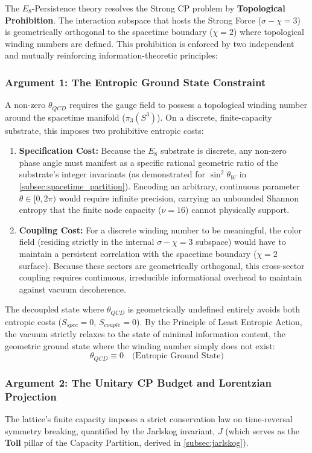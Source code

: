 The $E_8$-Persistence theory resolves the Strong CP problem by \textbf{Topological Prohibition}. The interaction subspace that hosts the Strong Force ($\sigma-\chi=3$) is geometrically orthogonal to the spacetime boundary ($\chi=2$) where topological winding numbers are defined. This prohibition is enforced by two independent and mutually reinforcing information-theoretic principles:

\subsubsection{Argument 1: The Entropic Ground State Constraint}
A non-zero $\theta_{QCD}$ requires the gauge field to possess a topological winding number around the spacetime manifold ($\pi_3(S^3)$). On a discrete, finite-capacity substrate, this imposes two prohibitive entropic costs:
\begin{enumerate}
    \item \textbf{Specification Cost:} Because the $E_8$ substrate is discrete, any non-zero phase angle must manifest as a specific rational geometric ratio of the substrate's integer invariants (as demonstrated for $\sin^2\theta_W$ in \cref{subsec:spacetime_partition}). Encoding an arbitrary, continuous parameter $\theta \in[0, 2\pi)$ would require infinite precision, carrying an unbounded Shannon entropy that the finite node capacity ($\nu=16$) cannot physically support.
    \item \textbf{Coupling Cost:} For a discrete winding number to be meaningful, the color field (residing strictly in the internal $\sigma-\chi=3$ subspace) would have to maintain a persistent correlation with the spacetime boundary ($\chi=2$ surface). Because these sectors are geometrically orthogonal, this cross-sector coupling requires continuous, irreducible informational overhead to maintain against vacuum decoherence.
\end{enumerate}
The decoupled state where $\theta_{QCD}$ is geometrically undefined entirely avoids both entropic costs ($S_{spec}=0$, $S_{couple}=0$). By the Principle of Least Entropic Action, the vacuum strictly relaxes to the state of minimal information content, the geometric ground state where the winding number simply does not exist:
\begin{equation}
    \theta_{QCD} \equiv 0 \quad \text{(Entropic Ground State)}
\end{equation}

\subsubsection{Argument 2: The Unitary CP Budget and Lorentzian Projection}
The lattice's finite capacity imposes a strict conservation law on time-reversal symmetry breaking, quantified by the Jarlskog invariant, $J$ (which serves as the \textbf{Toll} pillar of the Capacity Partition, derived in \cref{subsec:jarlskog}). 

